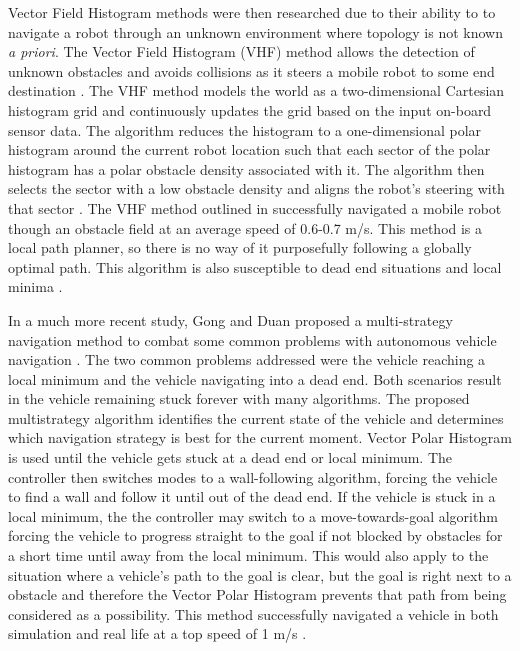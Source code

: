 \documentclass[12pt,onecolumn]{report}
\begin{document}
Vector Field Histogram methods were then researched due to their ability to to navigate a robot through an unknown environment where topology is not known \textit{a priori}. The Vector Field Histogram (VHF) method allows the detection of unknown obstacles and avoids collisions as it steers a mobile robot to some end destination \cite{Borenstein&Koren1991}. The VHF method models the world as a two-dimensional Cartesian histogram grid and continuously updates the grid based on the input on-board sensor data. The algorithm reduces the histogram to a one-dimensional polar histogram around the current robot location such that each sector of the polar histogram has a polar obstacle density associated with it. The algorithm then selects the sector with a low obstacle density and aligns the robot's steering with that sector \cite{Borenstein&Koren1991}. The VHF method outlined in \cite{Borenstein&Koren1991} successfully navigated a mobile robot though an obstacle field at an average speed of 0.6-0.7 m/s. This method is a local path planner, so there is no way of it purposefully following a globally optimal path. This algorithm is also susceptible to dead end situations and local minima \cite{Borenstein&Koren1991}.

In a much more recent study, Gong and Duan proposed a multi-strategy navigation method to combat some common problems with autonomous vehicle navigation \cite{Gong&Duan2009}. The two common problems addressed were the vehicle reaching a local minimum and the vehicle navigating into a dead end. Both scenarios result in the vehicle remaining stuck forever with many algorithms. The proposed multistrategy algorithm identifies the current state of the vehicle and determines which navigation strategy is best for the current moment. Vector Polar Histogram is used until the vehicle gets stuck at a dead end or local minimum. The controller then switches modes to a wall-following algorithm, forcing the vehicle to find a wall and follow it until out of the dead end. If the vehicle is stuck in a local minimum, the the controller may switch to a move-towards-goal algorithm forcing the vehicle to progress straight to the goal if not blocked by obstacles for a short time until away from the local minimum. This would also apply to the situation where a vehicle's path to the goal is clear, but the goal is right next to a obstacle and therefore the Vector Polar Histogram prevents that path from being considered as a possibility. This method successfully navigated a vehicle in both simulation and real life at a top speed of 1 m/s \cite{Gong&Duan2009}.
\end{document}
